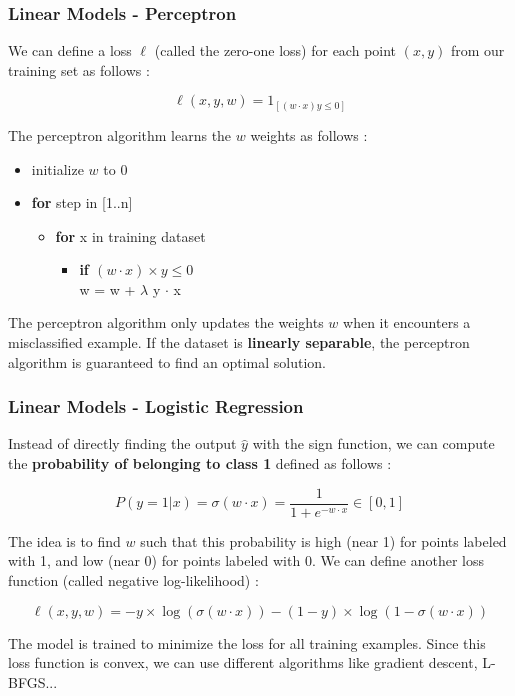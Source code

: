 \documentclass{beamer}
\begin{document}
\begin{frame}
  \frametitle{Linear Models - Perceptron}
  We can define a loss $\ell$ (called the zero-one loss) for each point $(x, y)$
  from our training set as follows :

  \begin{equation*}
    \ell(x, y, w) =  1_{[(w \cdot x)y \leq 0]}
  \end{equation*}

  The perceptron algorithm learns the $w$ weights as follows :
  \begin{itemize}
    \item initialize $w$ to 0
    \item \textbf{for} step in [1..n]
      \begin{itemize}
        \item \textbf{for} x in training dataset
        \begin{itemize}
          \item[] \textbf{if $ (w \cdot x) \times y \leq 0$}\\
            \hspace{.5cm} w = w + $\lambda$ y $\cdot$ x
        \end{itemize}
      \end{itemize}
  \end{itemize}

  The perceptron algorithm only updates the weights $w$ when it encounters a
  misclassified example. If the dataset is \textbf{linearly separable}, the
  perceptron algorithm is guaranteed to find an optimal solution.
\end{frame}

\begin{frame}
  \frametitle{Linear Models - Logistic Regression}
  Instead of directly finding the output $\hat{y}$ with the sign function, we
  can compute the \textbf{probability of belonging to class 1} defined as
  follows :

  \begin{equation*}
    P(y=1 | x) = \sigma(w \cdot x) = \frac{1}{1 + e^{-w \cdot x}} \in [0, 1]
  \end{equation*}

  The idea is to find $w$ such that this probability is high (near 1) for points
  labeled with 1, and low (near 0) for points labeled with 0. We can define
  another loss function (called negative log-likelihood) :

  \begin{equation*}
    \ell(x, y, w) = - y \times \log(\sigma(w \cdot x))
                 - (1 - y) \times \log(1 - \sigma(w \cdot x))
  \end{equation*}

  The model is trained to minimize the loss for all training examples. Since
  this loss function is convex, we can use different algorithms like gradient
  descent, L-BFGS...
\end{frame}
\end{document}
